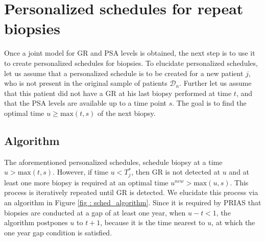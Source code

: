 \section{Personalized schedules for repeat biopsies}
\label{sec : pers_sched_approaches}
Once a joint model for GR and PSA levels is obtained, the next step is to use it to create personalized schedules for biopsies. To elucidate personalized schedules, let us assume that a personalized schedule is to be created for a new patient $j$, who is not present in the original sample of patients $\mathcal{D}_n$. Further let us assume that this patient did not have a GR at his last biopsy performed at time $t$, and that the PSA levels are available up to a time point $s$. The goal is to find the optimal time $u \geq \mbox{max}(t,s)$ of the next biopsy. 





\subsection{Algorithm}
\label{subsec : pers_sched_algorithm}
The aforementioned personalized schedules, schedule biopsy at a time $u > \mbox{max}(t,s)$. However, if time $u < T^*_j$, then GR is not detected at $u$ and at least one more biopsy is required at an optimal time $u^{new} > \mbox{max}(u,s)$. This process is iteratively repeated until GR is detected. We elucidate this process via an algorithm in Figure \ref{fig : sched_algorithm}. Since it is required by PRIAS that biopsies are conducted at a gap of at least one year, when $u - t < 1$, the algorithm postpones $u$ to $t + 1$, because it is the time nearest to $u$, at which the one year gap condition is satisfied.



